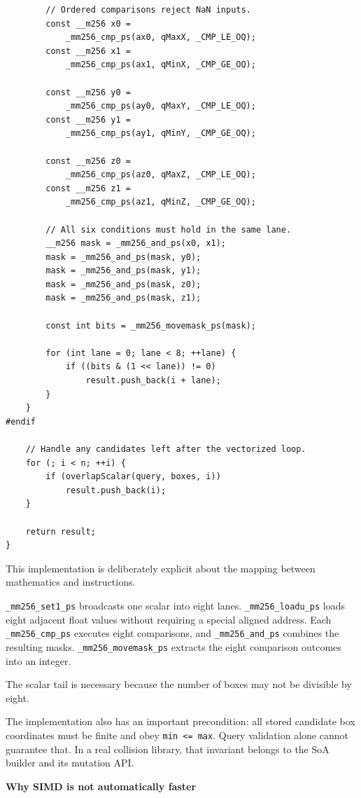 \begin{verbatim}
        // Ordered comparisons reject NaN inputs.
        const __m256 x0 =
            _mm256_cmp_ps(ax0, qMaxX, _CMP_LE_OQ);
        const __m256 x1 =
            _mm256_cmp_ps(ax1, qMinX, _CMP_GE_OQ);

        const __m256 y0 =
            _mm256_cmp_ps(ay0, qMaxY, _CMP_LE_OQ);
        const __m256 y1 =
            _mm256_cmp_ps(ay1, qMinY, _CMP_GE_OQ);

        const __m256 z0 =
            _mm256_cmp_ps(az0, qMaxZ, _CMP_LE_OQ);
        const __m256 z1 =
            _mm256_cmp_ps(az1, qMinZ, _CMP_GE_OQ);

        // All six conditions must hold in the same lane.
        __m256 mask = _mm256_and_ps(x0, x1);
        mask = _mm256_and_ps(mask, y0);
        mask = _mm256_and_ps(mask, y1);
        mask = _mm256_and_ps(mask, z0);
        mask = _mm256_and_ps(mask, z1);

        const int bits = _mm256_movemask_ps(mask);

        for (int lane = 0; lane < 8; ++lane) {
            if ((bits & (1 << lane)) != 0)
                result.push_back(i + lane);
        }
    }
#endif

    // Handle any candidates left after the vectorized loop.
    for (; i < n; ++i) {
        if (overlapScalar(query, boxes, i))
            result.push_back(i);
    }

    return result;
}
\end{verbatim}

This implementation is deliberately explicit about the mapping between mathematics and instructions.

\texttt{\_mm256\_set1\_ps} broadcasts one scalar into eight lanes. \texttt{\_mm256\_loadu\_ps} loads eight adjacent float values without requiring a special aligned address. Each \texttt{\_mm256\_cmp\_ps} executes eight comparisons, and \texttt{\_mm256\_and\_ps} combines the resulting masks. \texttt{\_mm256\_movemask\_ps} extracts the eight comparison outcomes into an integer.

The scalar tail is necessary because the number of boxes may not be divisible by eight.

The implementation also has an important precondition: all stored candidate box coordinates must be finite and obey \texttt{min\ \textless{}=\ max}. Query validation alone cannot guarantee that. In a real collision library, that invariant belongs to the SoA builder and its mutation API.

\textbf{Why SIMD is not automatically faster}

